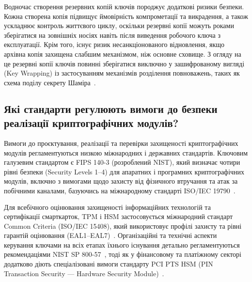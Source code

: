 Водночас створення резервних копій ключів породжує додаткові ризики безпеки. Кожна створена копія
підвищує ймовірність компрометації та викрадення, а також ускладнює контроль життєвого
циклу, оскільки резервні копії можуть роками зберігатися на зовнішніх носіях навіть після виведення
робочого ключа з експлуатації. Крім того, існує ризик несанкціонованого відновлення, якщо архівна
копія захищена слабшим механізмом, ніж основне сховище. З огляду на це резервні копії ключів повинні
зберігатися виключно у зашифрованому вигляді (Key Wrapping) із застосуванням механізмів розділення
повноважень, таких як схема поділу секрету Шаміра~\cite{nist57}.

\subsection{Які стандарти регулюють вимоги до безпеки реалізації криптографічних модулів?}

Вимоги до проєктування, реалізації та перевірки захищеності криптографічних модулів регламентуються
низкою міжнародних і державних стандартів. Ключовим галузевим стандартом є FIPS 140-3 (розроблений
NIST), який визначає чотири рівні безпеки (Security Levels 1--4) для апаратних і програмних
криптографічних модулів, включно з вимогами щодо захисту від фізичного втручання та атак за побічними
каналами, базуючись на міжнародному стандарті ISO/IEC 19790~\cite{nistfips}.

Для всебічного оцінювання захищеності інформаційних технологій та сертифікації смарткарток, TPM і HSM
застосовується міжнародний стандарт Common Criteria (ISO/IEC 15408), який використовує профілі захисту
та рівні гарантій оцінювання (EAL1--EAL7)~\cite{ccportal}. Організаційні та технічні аспекти керування
ключами на всіх етапах їхнього існування детально регламентуються рекомендаціями
NIST SP 800-57~\cite{nist57}, тоді як у фінансовому та платіжному секторі додатково діють
спеціалізовані вимоги стандарту PCI PTS HSM (PIN Transaction Security --- Hardware Security
Module)~\cite{pcihsm}.
